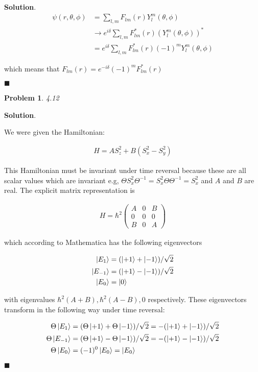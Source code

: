 \documentclass[12pt]{article}
\newtheorem{p}{Problem}
\theoremstyle{definition}
\newenvironment{s}{%
        \begin{trivlist} \item \textbf{Solution}. }{%
            \hspace*{\fill} $\blacksquare$\end{trivlist}}%
\begin{document}
{\begin{s}
\begin{align*}
\psi(r,\theta,\phi) &= \sum_{l,m}F_{lm}(r)Y_{l}^{m}(\theta,\phi)\\
&\rightarrow e^{i\delta}\sum_{l,m}F_{lm}^{*}(r)(Y_{l}^{m}(\theta,\phi))^{*}\\
&= e^{i\delta} \sum_{l,m}F_{lm}^{*}(r)(-1)^{m}Y_{l}^{m}(\theta,\phi)
\end{align*}

which means that $F_{lm}(r) = e^{-i\delta}(-1)^{m}F_{lm}^{*}(r)$

\end{s}

\begin{p}
4.12
\end{p}

\begin{s}

We were given the Hamiltonian:

\begin{align*}
H = AS_{z}^{2} + B(S_{x}^{2} - S_{y}^{2})
\end{align*}

This Hamiltonian must be invariant under time reversal because these are all scalar values which are invariant e.g, $\Theta S_{x}^{2}\Theta^{-1} = S_{x}^{2}\Theta\Theta^{-1} = S_{x}^{2}$ and $A$ and $B$ are real. The explicit matrix representation is

\begin{align*}
H = \hbar^{2}\begin{pmatrix}A&0&B\\0&0&0\\B&0&A\end{pmatrix}
\end{align*}

which according to Mathematica has the following eigenvectors


\begin{align*}
\ket{E_{1}} &= (\ket{+1}+\ket{-1})/\sqrt{2}\\
\ket{E_{-1}} &= (\ket{+1}-\ket{-1})/\sqrt{2}\\
\ket{E_{0}} &= \ket{0}\\
\end{align*}

with eigenvalues $\hbar^{2}(A+B), \hbar^{2}(A-B), 0$ respectively. These eigenvectors transform in the following way under time reversal:

\begin{align*}
\Theta\ket{E_{1}} &= (\Theta\ket{+1}+\Theta\ket{-1})/\sqrt{2} = -(\ket{+1}+\ket{-1})/\sqrt{2}\\
\Theta\ket{E_{-1}} &= (\Theta\ket{+1}-\Theta\ket{-1})/\sqrt{2} = -(\ket{+1}-\ket{-1})/\sqrt{2}\\
\Theta\ket{E_{0}} &= (-1)^{0}\ket{E_{0}} = \ket{E_{0}}\\
\end{align*}


\end{s}
\end{document}
